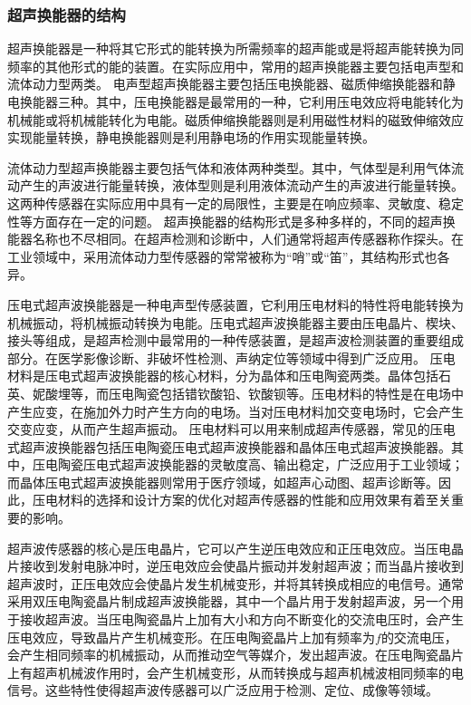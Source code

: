     \subsubsection{超声换能器的结构}
    超声换能器是一种将其它形式的能转换为所需频率的超声能或是将超声能转换为同频率的其他形式的能的装置。在实际应用中，常用的超声换能器主要包括电声型和流体动力型两类。
    电声型超声换能器主要包括压电换能器、磁质伸缩换能器和静电换能器三种。其中，压电换能器是最常用的一种，它利用压电效应将电能转化为机械能或将机械能转化为电能。磁质伸缩换能器则是利用磁性材料的磁致伸缩效应实现能量转换，静电换能器则是利用静电场的作用实现能量转换。\par
    流体动力型超声换能器主要包括气体和液体两种类型。其中，气体型是利用气体流动产生的声波进行能量转换，液体型则是利用液体流动产生的声波进行能量转换。这两种传感器在实际应用中具有一定的局限性，主要是在响应频率、灵敏度、稳定性等方面存在一定的问题。
    超声换能器的结构形式是多种多样的，不同的超声换能器名称也不尽相同。在超声检测和诊断中，人们通常将超声传感器称作探头。在工业领域中，采用流体动力型传感器的常常被称为“哨”或“笛”，其结构形式也各异。\par
    压电式超声波换能器是一种电声型传感装置，它利用压电材料的特性将电能转换为机械振动，将机械振动转换为电能。压电式超声波换能器主要由压电晶片、楔块、接头等组成，是超声检测中最常用的一种传感装置，是超声波检测装置的重要组成部分。在医学影像诊断、非破坏性检测、声纳定位等领域中得到广泛应用。
    压电材料是压电式超声波换能器的核心材料，分为晶体和压电陶瓷两类。晶体包括石英、妮酸埋等，而压电陶瓷包括错钦酸铅、钦酸钡等。压电材料的特性是在电场中产生应变，在施加外力时产生方向的电场。当对压电材料加交变电场时，它会产生交变应变，从而产生超声振动。
    压电材料可以用来制成超声传感器，常见的压电式超声波换能器包括压电陶瓷压电式超声波换能器和晶体压电式超声波换能器。其中，压电陶瓷压电式超声波换能器的灵敏度高、输出稳定，广泛应用于工业领域；而晶体压电式超声波换能器则常用于医疗领域，如超声心动图、超声诊断等。因此，压电材料的选择和设计方案的优化对超声传感器的性能和应用效果有着至关重要的影响。\par
    超声波传感器的核心是压电晶片，它可以产生逆压电效应和正压电效应。当压电晶片接收到发射电脉冲时，逆压电效应会使晶片振动并发射超声波；而当晶片接收到超声波时，正压电效应会使晶片发生机械变形，并将其转换成相应的电信号。通常采用双压电陶瓷晶片制成超声波换能器，其中一个晶片用于发射超声波，另一个用于接收超声波。当压电陶瓷晶片上加有大小和方向不断变化的交流电压时，会产生压电效应，导致晶片产生机械变形。在压电陶瓷晶片上加有频率为$f$的交流电压，会产生相同频率的机械振动，从而推动空气等媒介，发出超声波。在压电陶瓷晶片上有超声机械波作用时，会产生机械变形，从而转换成与超声机械波相同频率的电信号。这些特性使得超声波传感器可以广泛应用于检测、定位、成像等领域。\par
